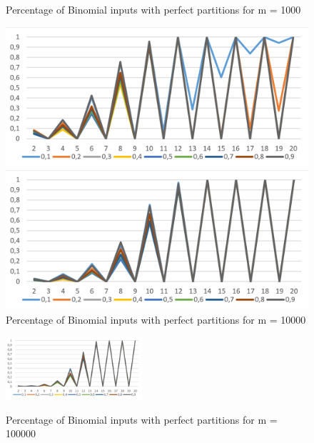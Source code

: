 \begin{figure}[h]
      \centering
      \begin{minipage}[b]{0.45\textwidth}
            \caption{Percentage of Binomial inputs with perfect partitions for m = 1000}
            \includegraphics[width=\textwidth]{figures/images/solvabilityOfInputs/binomial_Input_Solvable_m1000.png}
      \end{minipage}
      \hspace{0.75cm}
      \begin{minipage}[b]{0.45\textwidth}
            \caption{Percentage of Binomial inputs with perfect partitions for m = 10000}
            \includegraphics[width=\textwidth]{figures/images/solvabilityOfInputs/binomial_Input_Solvable_m10000.png}
      \end{minipage}
\end{figure}

\begin{figure}[h]
      \caption{Percentage of Binomial inputs with perfect partitions for m = 100000}
      \centering
      \includegraphics[width=0.45\textwidth]{figures/images/solvabilityOfInputs/binomial_Input_Solvable_m100000.png}\label{fig:lastBinPercentage}
\end{figure}


